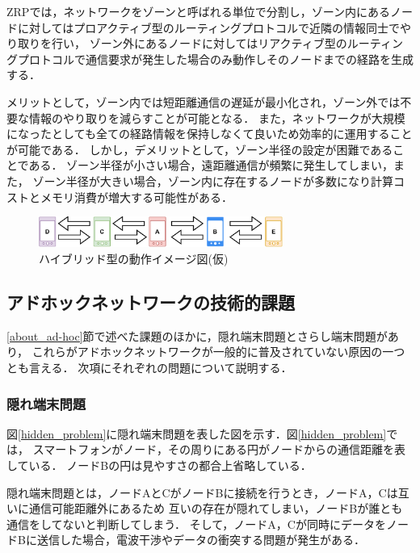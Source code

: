 \documentclass[a4paper, 11pt]{ltjsarticle}
\begin{document}
ZRPでは，ネットワークをゾーンと呼ばれる単位で分割し，ゾーン内にあるノードに対してはプロアクティブ型のルーティングプロトコルで近隣の情報同士でやり取りを行い，
ゾーン外にあるノードに対してはリアクティブ型のルーティングプロトコルで通信要求が発生した場合のみ動作しそのノードまでの経路を生成する．

メリットとして，ゾーン内では短距離通信の遅延が最小化され，ゾーン外では不要な情報のやり取りを減らすことが可能となる．
また，ネットワークが大規模になったとしても全ての経路情報を保持しなくて良いため効率的に運用することが可能である．
しかし，デメリットとして，ゾーン半径の設定が困難であることである．
ゾーン半径が小さい場合，遠距離通信が頻繁に発生してしまい，また，
ゾーン半径が大きい場合，ゾーン内に存在するノードが多数になり計算コストとメモリ消費が増大する可能性がある．

\begin{figure}[H]
  \centering
  \includegraphics[width=80mm]{proactive_model.pdf}
  \caption{ハイブリッド型の動作イメージ図(仮)}
  \label{hybrid}
\end{figure}

\clearpage
\subsection{アドホックネットワークの技術的課題}
\ref{about_ad-hoc}節で述べた課題のほかに，隠れ端末問題とさらし端末問題があり，
これらがアドホックネットワークが一般的に普及されていない原因の一つとも言える\cite{松井_進2012KJ00008330022}．
次項にそれぞれの問題について説明する．
\subsubsection{隠れ端末問題}
図\ref{hidden_problem}に隠れ端末問題を表した図を示す．図\ref{hidden_problem}では，
スマートフォンがノード，その周りにある円がノードからの通信距離を表している．
ノードBの円は見やすさの都合上省略している．

隠れ端末問題とは，ノードAとCがノードBに接続を行うとき，ノードA，Cは互いに通信可能距離外にあるため
互いの存在が隠れてしまい，ノードBが誰とも通信をしてないと判断してしまう．
そして，ノードA，Cが同時にデータをノードBに送信した場合，電波干渉やデータの衝突する問題が発生がある．
\end{document}
